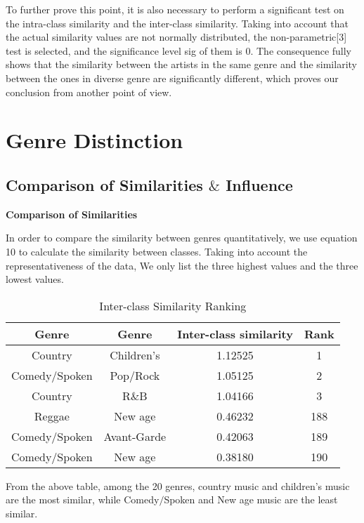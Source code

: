 \documentclass{mcmthesis}
\begin{document}
To further prove this point, it is also necessary to perform a significant test on the intra-class similarity and the inter-class similarity. Taking into account that the actual similarity values are not normally distributed, the non-parametric[3] test is selected, and the significance level sig of them is 0. The consequence fully shows that the similarity between the artists in the same genre and the similarity between  the ones in diverse genre are significantly different, which proves our conclusion from another point of view.

\section{Genre Distinction}
\subsection{Comparison of Similarities $\&$ Influence}

\noindent%
\textbf{Comparison of Similarities} 

In order to compare the similarity between genres quantitatively, we use equation 10 to calculate the similarity between classes. Taking into account the representativeness of the data, We only list the three highest values and the three lowest values.
\begin{table}[H]
	\centering  
	\caption{Inter-class Similarity Ranking}
	
	\label{table_time}
	
	\begin{tabular}{cccc}  
		
		\toprule   
		
		Genre&Genre &Inter-class similarity&Rank \\ 
		\midrule    
		Country&Children's&1.12525&1
		\\  
		Comedy$/$Spoken&Pop$/$Rock & 1.05125&2 
		\\ 
		Country &R$\&$B& 1.04166&3
		\\
		Reggae&New age&0.46232&188
		\\
		Comedy$/$Spoken&Avant-Garde&0.42063&189
		\\
			Comedy$/$Spoken&New age&0.38180&190
		\\
		\bottomrule  
	\end{tabular}
\end{table}
From the above table, among the 20 genres, country music and children’s music are the most similar, while Comedy$/$Spoken and New age music are the least similar.
\end{document}

